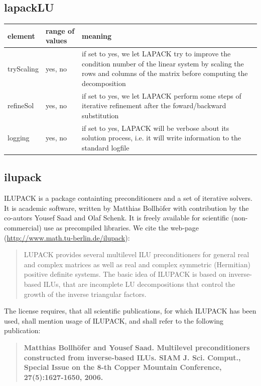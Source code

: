 \subsection{lapackLU}
%
%
\begin{center}
\begin{tabular}{llp{}}
\toprule
element & range of values & meaning \\
\midrule
tryScaling & yes, no & if set to yes, we let LAPACK try to improve the
                       condition number of the linear system by scaling the
                       rows and columns of the matrix before computing the
                       decomposition\\
\midrule
refineSol  & yes, no & if set to yes, we let LAPACK perform some steps of
                       iterative refinement after the foward/backward
                       substitution\\
\midrule
logging    & yes, no & if set to yes, LAPACK will be verbose about its solution
	               process, i.e. it will write information to the standard
	               logfile\\
\bottomrule
\end{tabular}
\end{center}
%
\subsection{ilupack}
\label{sec:ilupack}
ILUPACK is a package containting preconditioners and a set of iterative solvers.
It is academic software, written by Matthias Bollh\"ofer with contribution by
the co-autors Yousef Saad and Olaf Schenk. It is freely available for scientific
(non-commercial) use as precompiled libraries. We cite the web-page
(\url{http://www.math.tu-berlin.de/ilupack}):
\begin{quote}
LUPACK provides several multilevel ILU preconditioners for general real and
complex matrices as well as real and complex symmetric (Hermitian) positive
definite systems.
The basic idea of ILUPACK is based on inverse-based ILUs, that are incomplete LU
decompositions that control the growth of the inverse triangular factors. 
\end{quote}
The license requires, that all scientific publications, for which ILUPACK has
been used, shall mention usage of ILUPACK, and shall refer to the following
publication:

\begin{quote}
\textbf{Matthias Bollh\"ofer and Yousef Saad. Multilevel preconditioners
constructed from inverse-based ILUs. SIAM J. Sci. Comput., Special Issue on the
8-th Copper Mountain Conference, 27(5):1627-1650, 2006.}
\end{quote}

